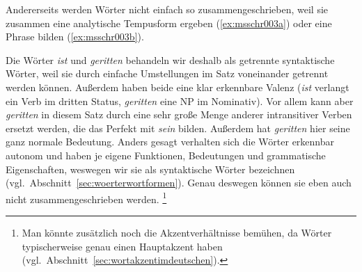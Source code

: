 Andererseits werden Wörter nicht einfach so zusammengeschrieben, \zB weil sie zusammen eine analytische Tempusform ergeben (\ref{ex:msschr003a}) oder eine Phrase bilden (\ref{ex:msschr003b}).

\begin{exe}
  \ex\label{ex:msschr003} 
  \begin{xlist}
  \end{xlist}
\end{exe}

Die Wörter \textit{ist} und \textit{geritten} behandeln wir \zB deshalb als getrennte syntaktische Wörter, weil sie durch einfache Umstellungen im Satz voneinander getrennt werden können.
Außerdem haben beide eine klar erkennbare Valenz (\textit{ist} verlangt ein Verb im dritten Status, \textit{geritten} eine NP im Nominativ).
Vor allem kann aber \textit{geritten} in diesem Satz durch eine sehr große Menge anderer intransitiver Verben ersetzt werden, die das Perfekt mit \textit{sein} bilden.
Außerdem hat \textit{geritten} hier seine ganz normale Bedeutung.
Anders gesagt verhalten sich die Wörter erkennbar autonom und haben je eigene Funktionen, Bedeutungen und grammatische Eigenschaften, weswegen wir sie als syntaktische Wörter bezeichnen (vgl.\ Abschnitt~\ref{sec:woerterwortformen}).
Genau deswegen können sie eben auch nicht zusammengeschrieben werden.%
\footnote{Man könnte zusätzlich noch die Akzentverhältnisse bemühen, da Wörter typischerweise genau einen Hauptakzent haben (vgl.\ Abschnitt~\ref{sec:wortakzentimdeutschen}).}

